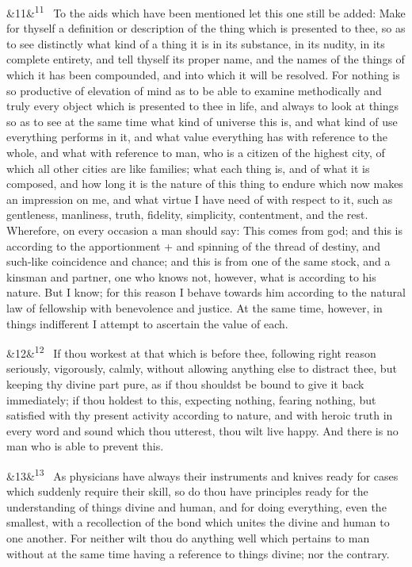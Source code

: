 \documentclass[12pt]{article}
\newcommand{\para}[1][]{\par\noindent\ifx&#1&\else\textsuperscript{\footnotesize #1}~\fi}
\begin{document}
\para[11] To the aids which have been mentioned let this one still be added:
Make for thyself a definition or description of the thing which is
presented to thee, so as to see distinctly what kind of a thing it is in
its substance, in its nudity, in its complete entirety, and tell thyself
its proper name, and the names of the things of which it has been
compounded, and into which it will be resolved. For nothing is so
productive of elevation of mind as to be able to examine methodically
and truly every object which is presented to thee in life, and always to
look at things so as to see at the same time what kind of universe this
is, and what kind of use everything performs in it, and what value
everything has with reference to the whole, and what with reference to
man, who is a citizen of the highest city, of which all other cities are
like families; what each thing is, and of what it is composed, and how
long it is the nature of this thing to endure which now makes an
impression on me, and what virtue I have need of with respect to it,
such as gentleness, manliness, truth, fidelity, simplicity, contentment,
and the rest. Wherefore, on every occasion a man should say: This comes
from god; and this is according to the apportionment + and spinning of
the thread of destiny, and such-like coincidence and chance; and this is
from one of the same stock, and a kinsman and partner, one who knows
not, however, what is according to his nature. But I know; for this
reason I behave towards him according to the natural law of fellowship
with benevolence and justice. At the same time, however, in things
indifferent I attempt to ascertain the value of each.

\para[12] If thou workest at that which is before thee, following right reason
seriously, vigorously, calmly, without allowing anything else to
distract thee, but keeping thy divine part pure, as if thou shouldst be
bound to give it back immediately; if thou holdest to this, expecting
nothing, fearing nothing, but satisfied with thy present activity
according to nature, and with heroic truth in every word and sound which
thou utterest, thou wilt live happy. And there is no man who is able to
prevent this.

\para[13] As physicians have always their instruments and knives ready for
cases which suddenly require their skill, so do thou have principles
ready for the understanding of things divine and human, and for doing
everything, even the smallest, with a recollection of the bond which
unites the divine and human to one another. For neither wilt thou do
anything well which pertains to man without at the same time having a
reference to things divine; nor the contrary.
\end{document}
